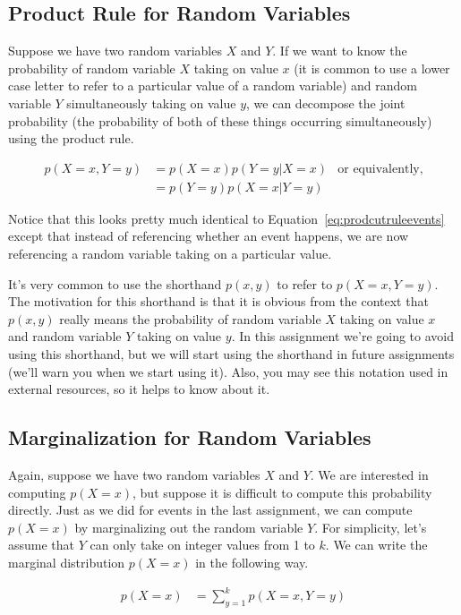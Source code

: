 \documentclass[assignment02_Solutions]{subfiles}
\begin{document}
\subsection{Product Rule for Random Variables}
Suppose we have two random variables $X$ and $Y$.  If we want to know the probability of random variable $X$ taking on value $x$ (it is common to use a lower case letter to refer to a particular value of a random variable) and random variable $Y$ simultaneously taking on value $y$, we can decompose the joint probability (the probability of both of these things occurring simultaneously) using the product rule.

\begin{align}
p(X = x, Y = y) &= p(X=x)p(Y=y | X=x) & \mbox{or equivalently,}\\
&= p(Y=y)p(X=x|Y=y) \nonumber
\end{align}

Notice that this looks pretty much identical to Equation~\ref{eq:prodcutruleevents} except that instead of referencing whether an event happens, we are now referencing a random variable taking on a particular value.

\begin{notice}
It's very common to use the shorthand $p(x, y)$ to refer to $p(X = x, Y = y)$.  The motivation for this shorthand is that it is obvious from the context that $p(x, y)$ really means the probability of random variable $X$ taking on value $x$ and random variable $Y$ taking on value $y$.  In this assignment we're going to avoid using this shorthand, but we will start using the shorthand in future assignments (we'll warn you when we start using it).  Also, you may see this notation used in external resources, so it helps to know about it.
\end{notice}

\subsection{Marginalization for Random Variables}
Again, suppose we have two random variables $X$ and $Y$.  We are interested in computing $p(X = x)$, but suppose it is difficult to compute this probability directly.  Just as we did for events in the last assignment, we can compute $p(X=x)$ by marginalizing out the random variable $Y$.  For simplicity, let's assume that $Y$ can only take on integer values from 1 to $k$.  We can write the marginal distribution $p(X=x)$ in the following way.

\begin{align}
p(X=x) &= \sum_{y=1}^k p(X=x, Y=y)\label{eq:rvmarginal}
\end{align}
\end{document}
